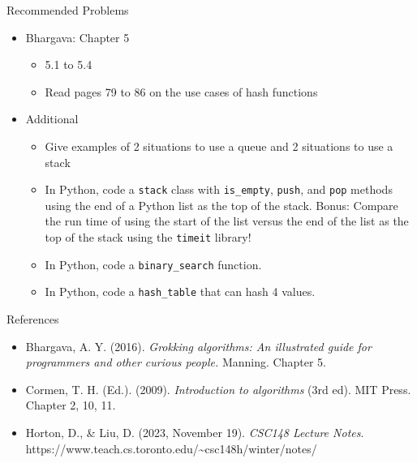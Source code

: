 \documentclass[
  ignorenonframetext,
]{beamer}
\begin{document}
\begin{frame}[fragile]{Recommended Problems}
\protect\hypertarget{recommended-problems}{}
\begin{itemize}
\item
  Bhargava: Chapter 5

  \begin{itemize}
  \item
    5.1 to 5.4
  \item
    Read pages 79 to 86 on the use cases of hash functions
  \end{itemize}
\item
  Additional

  \begin{itemize}
  \item
    Give examples of 2 situations to use a queue and 2 situations to use
    a stack
  \item
    In Python, code a \texttt{stack} class with \texttt{is\_empty},
    \texttt{push}, and \texttt{pop} methods using the end of a Python
    list as the top of the stack. Bonus: Compare the run time of using
    the start of the list versus the end of the list as the top of the
    stack using the \texttt{timeit} library!
  \item
    In Python, code a \texttt{binary\_search} function.
  \item
    In Python, code a \texttt{hash\_table} that can hash 4 values.
  \end{itemize}
\end{itemize}
\end{frame}

\begin{frame}{References}
\protect\hypertarget{references}{}
\begin{itemize}
\item
  Bhargava, A. Y. (2016). \emph{Grokking algorithms: An illustrated
  guide for programmers and other curious people.} Manning. Chapter 5.
\item
  Cormen, T. H. (Ed.). (2009). \emph{Introduction to algorithms} (3rd
  ed). MIT Press. Chapter 2, 10, 11.
\item
  Horton, D., \& Liu, D. (2023, November 19). \emph{CSC148 Lecture
  Notes}.
  https://www.teach.cs.toronto.edu/\textasciitilde csc148h/winter/notes/
\end{itemize}
\end{frame}
\end{document}
